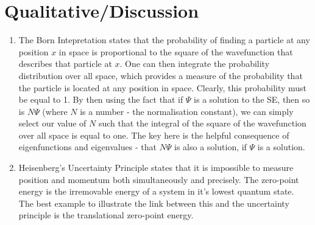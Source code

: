 \documentclass{memoir}[11pt,oneside,a4paper,openany]
\begin{document}
\section*{Qualitative/Discussion}
\begin{enumerate}
	\item The Born Intepretation states that the probability of finding a particle at any position $x$ in space is proportional to the square of the wavefunction that describes that particle at $x$. One can then integrate the probability distribution over all space, which provides a measure of the probability that the particle is located at any position in space. Clearly, this probability must be equal to 1. By then using the fact that if $\Psi$ is a solution to the SE, then so is $N\Psi$ (where $N$ is a number - the normalisation constant), we can simply select our value of $N$ such that the integral of the square of the wavefunction over all space is equal to one. The key here is the helpful consequence of eigenfunctions and eigenvalues - that $N\Psi$ is also a solution, if $\Psi$ is a solution.
	\item Heisenberg's Uncertainty Principle states that it is impossible to measure position and momentum both simultaneously and precisely. The zero-point energy is the irremovable energy of a system in it's lowest quantum state. The best example to illustrate the link between this and the uncertainty principle is the translational zero-point energy. 


\end{enumerate}
\end{document}
